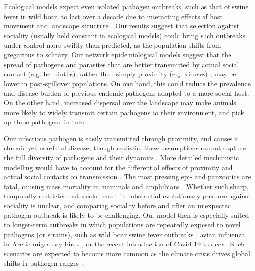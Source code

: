 Ecological models expect even isolated pathogen outbreaks, such as that of swine fever in wild boar, to last over a decade due to interacting effects of host movement and landscape structure \citep{scherer2020}.
Our results suggest that selection against sociality (usually held constant in ecological models) could bring such outbreaks under control more swiftly than predicted, as the population shifts from gregarious to solitary.
Our network epidemiological models suggest that the spread of pathogens and parasites that are better transmitted by actual social contact (e.g. helminths), rather than simply proximity (e.g. viruses) \citep{rimbach2015}, may be lower in post-spillover populations.
On one hand, this could reduce the prevalence and disease burden of previous endemic pathogens adapted to a more social host.
On the other hand, increased dispersal over the landscape may make animals more likely to widely transmit certain pathogens to their environment, and pick up these pathogens in turn \citep[][]{rimbach2015,scherer2020}.

Our infectious pathogen is easily transmitted through proximity, and causes a chronic yet non-fatal disease; though realistic, these assumptions cannot capture the full diversity of pathogens and their dynamics \citep{white2018,scherer2020, lunn2021}.
More detailed mechanistic modelling would have to account for the differential effects of proximity and actual social contacts on transmission \citep{rimbach2015}.
The most pressing epi- and panzootics are fatal, causing mass mortality in mammals \citep{blehert2009, fereidouni2019} and amphibians \citep{scheele2019,sanderson2020}.
Whether such sharp, temporally restricted outbreaks result in substantial evolutionary pressure against sociality is unclear, and comparing sociality before and after an unexpected pathogen outbreak is likely to be challenging.
Our model then is especially suited to longer-term outbreaks in which populations are repeatedly exposed to novel pathogens (or strains), such as wild boar swine fever outbreaks \citep{scherer2020}, avian influenza in Arctic migratory birds \citep{globconsorth5n82016}, or the recent introduction of Covid-19 to deer \citep{kuchipudi2022}.
Such scenarios are expected to become more common as the climate crisis drives global shifts in pathogen ranges \citep{carlson2021}.

